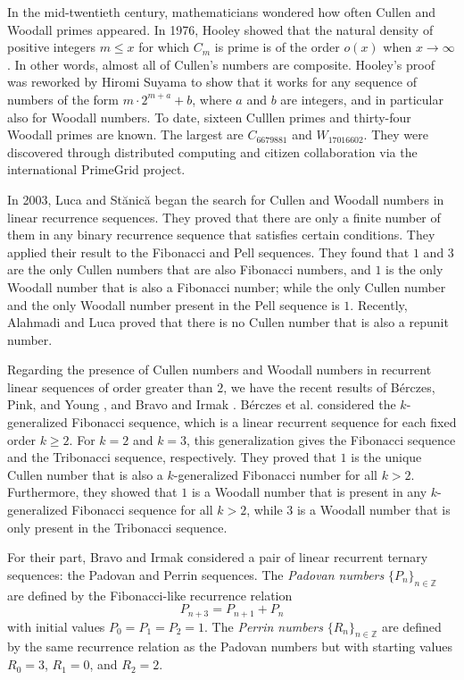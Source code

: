 \documentclass[11pt,a4paper]{article}
\numberwithin{equation}{section}
\numberwithin{table}{section}
\numberwithin{figure}{section}
\begin{document}
In the mid-twentieth century, mathematicians wondered how often Cullen and Woodall primes appeared. In 1976, Hooley \cite{CH} showed that the natural density of positive integers $m\le x$ for which $C_m$ is prime is of the order $o(x)$ when $x\rightarrow \infty$. In other words, almost all of Cullen's numbers are composite. Hooley's proof was reworked by Hiromi Suyama to show that it works for any sequence of numbers of the form $m\cdot 2^{m+a}+b$, where $a$ and $b$ are integers, and in particular also for Woodall numbers. To date, sixteen Culllen primes and thirty-four Woodall primes are known. The largest are $C_{6679881}$ and $W_{17016602}$. They were discovered through distributed computing and citizen collaboration via the international PrimeGrid project.

In 2003, Luca and St\u{a}nic\u{a} \cite{12} began the search for Cullen and Woodall numbers in linear recurrence sequences. They proved that there are only a finite number of them in any binary recurrence sequence that satisfies certain conditions. They applied their result to the Fibonacci and Pell sequences. They found that $1$ and $3$ are the only Cullen numbers that are also Fibonacci numbers, and $1$ is the only Woodall number that is also a Fibonacci number; while the only Cullen number and the only Woodall number present in the Pell sequence is $1$. Recently, Alahmadi and Luca \cite{1} proved that there is no Cullen number that is also a repunit number.

Regarding the presence of Cullen numbers and Woodall numbers in recurrent linear sequences of order greater than $2$, we have the recent results of B\'erczes, Pink, and Young \cite{24}, and Bravo and Irmak \cite{BrIrmak}. B\'erczes et al. \cite{24} considered the $k$-generalized Fibonacci sequence, which is a linear recurrent sequence for each fixed order $k\ge 2$. For $k=2$ and $k=3$, this generalization gives the Fibonacci sequence and the Tribonacci sequence, respectively. They proved that $1$ is the unique Cullen number that is also a $k$-generalized Fibonacci number for all $k>2$. Furthermore, they showed that $1$ is a Woodall number that is present in any $k$-generalized Fibonacci sequence for all $k>2$, while $3$ is a Woodall number that is only present in the Tribonacci sequence.

For their part, Bravo and Irmak \cite{BrIrmak} considered a pair of linear recurrent ternary sequences: the Padovan and Perrin sequences. The \textit{Padovan numbers} $\{P_{n}\}_{n\in \mathbb{Z}}$ are defined by the Fibonacci-like recurrence relation
$$
P_{n+3}=P_{n+1}+P_{n}
$$
with initial values $P_{0}=P_{1}=P_{2}=1$. The \textit{Perrin numbers} $\{R_{n}\}_{n\in \mathbb{Z}}$ are defined by the same recurrence relation as the
Padovan numbers but with starting values $R_{0}=3$, $R_{1}=0$, and $R_{2}=2$.
\end{document}
